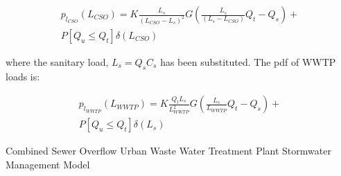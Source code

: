 \documentclass{agujournal2018}
\begin{document}
\begin{linenomath*}
\begin{eqnarray}\nonumber
p_{l_{CSO}} \left(L_{CSO} \right) = K  \frac{L_s}{\left(L_{CSO}-L_s \right)^2}    G\left(\frac{L_s}{\left(L_s - L_{CSO}\right)}  Q_t - Q_s \right)  + \\
P\left[Q_u \le Q_t \right]\delta\left(L_{CSO}\right)
\label{eq:a11}
\end{eqnarray}
\end{linenomath*}
where the sanitary load, $L_s = Q_s  C_s$ has been substituted. The pdf of WWTP loads is:
\begin{linenomath*}
\begin{eqnarray}
p_{l_{WWTP}} \left(L_{WWTP} \right) = K  \frac{Q_t L_s}{L_{WWTP}^2}    G\left(\frac{L_s}{L_{WWTP}}  Q_t - Q_s \right)  + \\
P\left[Q_u \le Q_t \right]\delta\left(L_s\right)
\label{eq:a12}
\end{eqnarray}
\end{linenomath*} 


%
%

%
   \begin{acronyms}
    Combined Sewer Overf\/low
    Urban Waste Water Treatment Plant
    Stormwater Management Model
   \end{acronyms}

%




%
%
%
%
%
%
%
%
\end{document}

